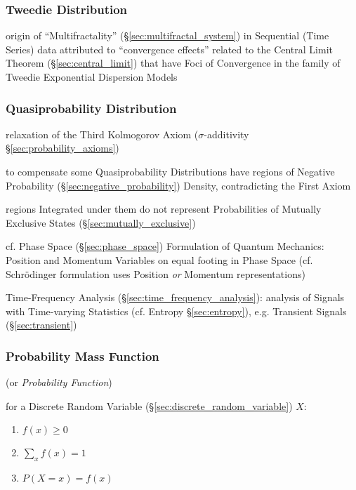 \subsubsection{Tweedie Distribution}\label{sec:tweedie_distribution}

\fist origin of ``Multifractality'' (\S\ref{sec:multifractal_system}) in
Sequential (Time Series) data attributed to ``convergence effects'' related to
the Central Limit Theorem (\S\ref{sec:central_limit}) that have Foci of
Convergence in the family of Tweedie Exponential Dispersion Models



\subsubsection{Quasiprobability Distribution}
\label{sec:quasiprobability_distribution}

relaxation of the Third Kolmogorov Axiom ($\sigma$-additivity
\S\ref{sec:probability_axioms})

to compensate some Quasiprobability Distributions have regions of Negative
Probability (\S\ref{sec:negative_probability}) Density, contradicting the First
Axiom

regions Integrated under them do not represent Probabilities of Mutually
Exclusive States (\S\ref{sec:mutually_exclusive})

cf. Phase Space (\S\ref{sec:phase_space}) Formulation of Quantum Mechanics:
Position and Momentum Variables on equal footing in Phase Space (cf.
Schr\"odinger formulation uses Position \emph{or} Momentum representations)

\fist Time-Frequency Analysis (\S\ref{sec:time_frequency_analysis}): analysis
of Signals with Time-varying Statistics (cf. Entropy \S\ref{sec:entropy}), e.g.
Transient Signals (\S\ref{sec:transient})



\subsubsection{Probability Mass Function}\label{sec:probability_mass}

(or \emph{Probability Function})

for a Discrete Random Variable (\S\ref{sec:discrete_random_variable})
$X$:
\begin{enumerate}
  \item $f(x) \geq 0$
  \item $\sum_x f(x) = 1$
  \item $P(X = x) = f(x)$
\end{enumerate}


